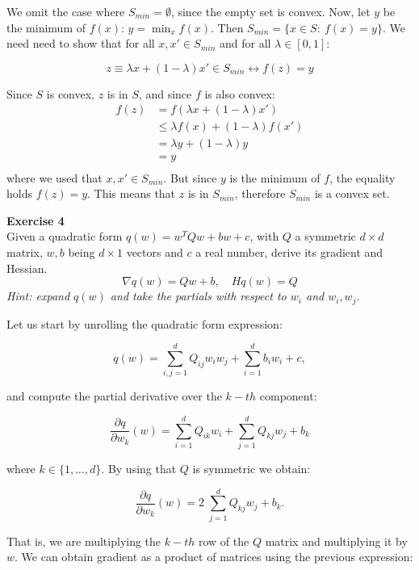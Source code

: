 \documentclass[11pt,table]{article}
\newenvironment{problem}[2][Exercise]
    { \begin{mdframed}[backgroundcolor=gray!20] \textbf{#1 #2} \\}
    {  \end{mdframed}}
\begin{document}
We omit the case where \(S_{min} = \emptyset\), since the empty set is convex. Now, let \(y\) be the minimum of \(f(x)\): \(y = \min_x f(x)\). Then \( S_{min} = \{x \in S : \ f(x) = y \} \). We need need to show that for all \(x, x' \in S_{min}\) and for all \(\lambda \in [0,1]\):

\[
	z \equiv \lambda x + (1-\lambda) x' \in S_{min} \leftrightarrow f(z) = y
\]

Since \(S\) is convex, \(z\) is in \(S\), and since \(f\) is also convex:
\begin{align*}
	f(z) & = f\left(\lambda x + (1-\lambda) x'\right) \\
	& \leq \lambda f(x) + (1-\lambda) f(x') \\
	& = \lambda y + (1-\lambda) y \\
	& = y \\
\end{align*}
where we used that \(x, x'\in S_{min}\). But since \(y\) is the minimum of \(f\), the equality holds \(f(z) = y\). This means that \(z\) is in \(S_{min}\), therefore \(S_{min}\) is a convex set.

\begin{problem}{4}
  Given a quadratic form \( q(w) = w^TQw + bw + c \), with \( Q \) a symmetric \( d\times d \) matrix, \( w,b\) being \(d\times 1 \) vectors and \( c \) a real number, derive its gradient and Hessian.
  \[
  \nabla q(w) = Qw + b, \quad Hq(w) = Q  
  \]
  \emph{Hint: expand \(q(w)\) and take the partials with respect to \(w_i\) and \(w_i,w_j\).}
\end{problem}

Let us start by unrolling the quadratic form expression:

\[
	q(w) = \sum_{i,j=1}^{d} Q_{ij} w_{i}w_{j} + \sum_{i=1}^{d}b_{i}w_{i} + c,
\]

and compute the partial derivative over the \(k-th\) component:

\[
	\frac{\partial q}{\partial w_k} (w) = \sum_{i=1}^{d} Q_{ik} w_{i} + \sum_{j=1}^{d} Q_{kj} w_{j} + b_{k}
\]

where \(k \in \{1, \ldots, d\}\). By using that \(Q\) is symmetric we obtain:

\begin{equation}
	\label{eq-4}
	\frac{\partial q}{\partial w_k} (w) = 2 \; \sum_{j=1}^{d} Q_{kj} w_{j} + b_{k}.
\end{equation}

That is, we are multiplying the \(k-th\) row of the \(Q\) matrix and multiplying it by \(w\). We can obtain gradient as a product of matrices using the previous expression:
\end{document}
